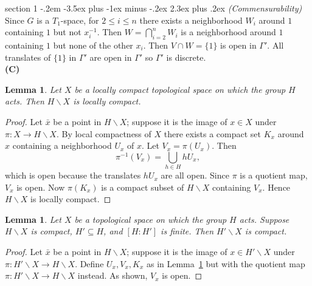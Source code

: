\documentclass[12pt]{article}
\makeatletter
\theoremstyle{norm}
\newtheorem{lem}[thm]{Lemma}
\newcommand{\subeq}[0]{\subseteq}
\newcommand{\Ga}[0]{\Gamma}
\newcommand{\subprob}[1]{\noindent\textbf{#1}\\}
\newcommand{\bs}[0]{\backslash}
\newenvironment{problem}{\@startsection
       {section}
       {1}
       {-.2em}
       {-3.5ex plus -1ex minus -.2ex}
       {2.3ex plus .2ex}
       {\pagebreak[3]%
       \large\bf\noindent{Problem }
       }
       }
       {%
       }
\makeatother
\begin{document}
\begin{problem}{\it (Commensurability)}
Since $G$ is a $T_1$-space, for $2\leq i\leq n$ there exists a neighborhood $W_i$ around $1$ containing $1$ but not $x_i^{-1}$. Then $W=\bigcap_{i=2}^n W_i$ is a neighborhood around $1$ containing $1$ but none of the other $x_i$. Then $V\cap W=\{1\}$ is open in $\Ga'$. All translates of $\{1\}$ in $\Ga'$ are open in $\Ga'$ so $\Ga'$ is discrete.\\

\subprob{(C)}
\begin{lem}\label{p2-1-l1}
Let $X$ be a locally compact topological space on which the group $H$ acts.  Then $H\backslash X$ is locally compact.
\end{lem}
\begin{proof}
Let $\bar x$ be a point in $H\bs X$; suppose it is the image of $x\in X$ under $\pi:X\to H\bs X$. By local compactness of $X$ there exists a compact set $K_x$ around $x$ containing a neighborhood $U_x$ of $x$. Let $V_x=\pi (U_x)$. Then
\begin{equation}\label{p2-1-1}
\pi^{-1}(V_x)=\bigcup_{h\in H} h U_x,
\end{equation}
which is open because the translates $h U_x$ are all open. Since $\pi$ is a quotient map, $V_x$ is open. Now $\pi(K_x)$ is a compact subset of $H\bs X$ containing $V_x$. Hence $H\bs X$ is locally compact.
\end{proof}
\begin{lem}\label{p2-1-l2}
Let $X$ be a topological space on which the group $H$ acts.
Suppose $H\bs X$ is compact, $H'\subeq H$, and $[H:H']$ is finite. 
Then $H'\bs X$ is compact.
\end{lem}
\begin{proof}
Let $\bar x$ be a point in $H\bs X$; suppose it is the image of $x\in H'\bs X$ under $\pi:H'\bs X\to H\bs X$. %
Define $U_x,V_x,K_x$ as in Lemma~\ref{p2-1-l1} but with the quotient map $\pi:H'\bs X\to H\bs X$ instead. As shown, $V_x$ is open.


\end{proof}
\end{problem}
\end{document}
